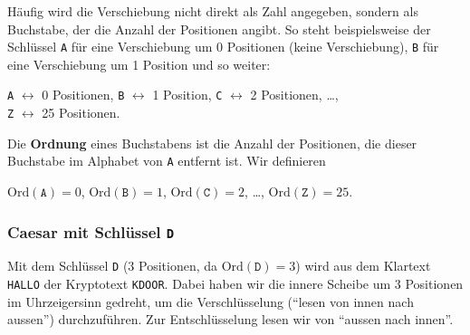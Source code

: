 \begin{frame}
    \begin{myremark}\label{myremark:buchstaben_als_zahlen}
        Häufig wird die Verschiebung nicht direkt als Zahl angegeben, sondern als Buchstabe, der die Anzahl der Positionen angibt. So steht beispielsweise der Schlüssel \texttt{A} für eine Verschiebung um 0 Positionen (keine Verschiebung), \texttt{B} für eine Verschiebung um 1 Position und so weiter:
        \begin{center}
            \texttt{A} $\leftrightarrow$ 0 Positionen, \texttt{B} $\leftrightarrow$ 1 Position, \texttt{C} $\leftrightarrow$ 2 Positionen, \dots , \\
            \texttt{Z} $\leftrightarrow$ 25 Positionen.
        \end{center}
    \end{myremark}
\end{frame}


\begin{frame}
    \begin{mydefinition}\label{mydefinition:ordnung_buchstabe}
        Die \textbf{Ordnung} eines Buchstabens ist die Anzahl der Positionen, die dieser Buchstabe im Alphabet von \texttt{A} entfernt ist. Wir definieren
        \begin{center}
            $\text{Ord}(\texttt{A}) = 0$, $\text{Ord}(\texttt{B}) = 1$, $\text{Ord}(\texttt{C}) = 2$, \dots, $\text{Ord}(\texttt{Z}) = 25$.
        \end{center}
    \end{mydefinition}
\end{frame}


\begin{frame}
    \frametitle{Caesar mit Schlüssel \texttt{D}}
    \begin{minipage}{.5\textwidth}
        Mit dem Schlüssel \texttt{D} (3 Positionen, da $\text{Ord}(\texttt{D}) = 3$) wird aus dem Klartext \texttt{HALLO} der Kryptotext \texttt{KDOOR}.
        \vfill
        Dabei haben wir die innere Scheibe um 3 Positionen im Uhrzeigersinn gedreht, um die Verschlüsselung (\enquote{lesen von innen nach aussen}) durchzuführen. 
        \vfill
        Zur Entschlüsselung lesen wir von \enquote{aussen nach innen}.
    \end{minipage}%
    \hspace{0.05\textwidth}%
    \begin{minipage}{.45\textwidth}
        \begin{figure}[H]
            \centering
            \resizebox{\linewidth}{!}{\caesar[3]}
        \end{figure}
    \end{minipage}
\end{frame}



